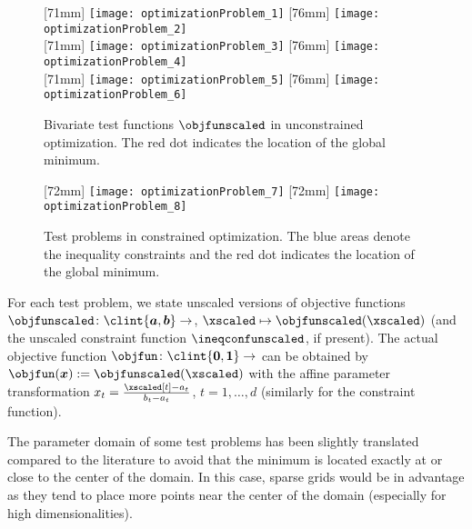\begin{figure}
  [71mm]{%
    \texttt{[image: optimizationProblem\_1]}%
  }%
  \hfill%
  [76mm]{%
    \texttt{[image: optimizationProblem\_2]}%
  }\\[2.5mm]%
  [71mm]{%
    \texttt{[image: optimizationProblem\_3]}%
  }%
  \hfill%
  [76mm]{%
    \texttt{[image: optimizationProblem\_4]}%
  }\\[2.5mm]%
  [71mm]{%
    \texttt{[image: optimizationProblem\_5]}%
  }%
  \hfill%
  [76mm]{%
    \texttt{[image: optimizationProblem\_6]}%
  }%
  \caption[%
    Unconstrained test problems%
  ]{%
    Bivariate test functions $\objfunscaled$ in unconstrained optimization.
    The \textcolor{C1}{red dot} indicates the location of the
    global minimum.%
  }%
  \label{fig:unconstrainedOptimizationProblem}%
\end{figure}

\begin{figure}
  [72mm]{%
    \texttt{[image: optimizationProblem\_7]}%
  }%
  \hfill%
  [72mm]{%
    \texttt{[image: optimizationProblem\_8]}%
  }%
  \caption[%
    Constrained test problems%
  ]{%
    Test problems in constrained optimization.
    The \textcolor{C0}{blue areas} denote the inequality constraints and
    the \textcolor{C1}{red dot} indicates the location of the
    global minimum.%
  }%
  \label{fig:constrainedOptimizationProblem}%
\end{figure}

For each test problem, we state unscaled versions of objective functions
$\objfunscaled\colon \clint{\*a, \*b} \to \real$,
$\xscaled \mapsto \objfunscaled(\xscaled)$
(and the unscaled constraint function $\ineqconfunscaled$, if present).
The actual objective function $\objfun\colon \clint{\*0, \*1} \to \real$
can be obtained by $\objfun(\*x) := \objfunscaled(\xscaled)$
with the affine parameter transformation
$x_t = \tfrac{\xscaled[t] - a_t}{b_t - a_t}$, $t = 1, \dotsc, d$
(similarly for the constraint function).

The parameter domain of some test problems has been slightly translated
compared to the literature
to avoid that the minimum is located exactly at or close to
the center of the domain.
In this case, sparse grids would be in advantage as
they tend to place more points near the center of the domain
(especially for high dimensionalities).
